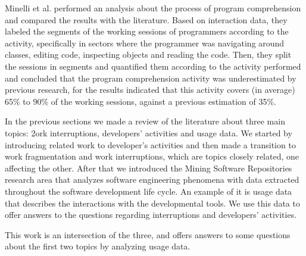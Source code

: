 Minelli et al. \cite{MMLK14} performed an analysis about the process of program comprehension and compared the results with the literature. Based on interaction data, they labeled the segments of the working sessions of programmers according to the activity, specifically in sectors where the programmer was navigating around classes, editing code, inspecting objects and reading the code. Then, they split the sessions in segments and quantified them according to the activity performed and concluded that the program comprehension activity was underestimated by previous research, for the results indicated that this activity covers (in average) 65\% to 90\% of the working sessions, against a previous estimation of 35\%.


\begin{changedforreviewerlong}
In the previous sections we made a review of the literature about three main topics: 2ork interruptions, developers' activities and usage data. We started by introducing related work to developer's activities and then made a transition to work fragmentation and work interruptions, which are topics closely related, one affecting the other. After that we introduced the Mining Software Repositories research area that analyzes software engineering phenomena with data extracted throughout the software development life cycle. An example of it is usage data that describes the interactions with the developmental tools. We use this data to offer answers to the questions regarding interruptions and developers' activities.

This work is an intersection of the three, and offers answers to some questions about the first two topics by analyzing usage data. 
\end{changedforreviewerlong}